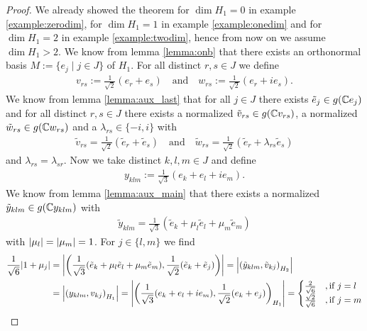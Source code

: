 \begin{proof}
	We already showed the theorem for $\dim H_1 = 0$ in example \ref{example:zerodim}, for $\dim H_1 = 1$ in example \ref{example:onedim} and for $\dim H_1 = 2$ in example \ref{example:twodim}, hence from now on we assume $\dim H_1 > 2$. We know from lemma \ref{lemma:onb} that there exists an orthonormal basis $M := \{e_j \mid j \in J\}$ of $H_1$. For all distinct $r,s \in J$ we define
	\begin{align*}
		v_{rs} := \frac{1}{\sqrt{2}}(e_r + e_s) \quad \text{and} \quad w_{rs} := \frac{1}{\sqrt{2}}(e_r + ie_s).
	\end{align*}
	 We know from lemma \ref{lemma:aux_last} that for all $j \in J$ there exists $\tilde{e}_j \in g(\mathbb{C} e_j)$ and for all distinct $r,s \in J$ there exists a normalized $\tilde{v}_{rs} \in g(\mathbb{C} v_{rs})$, a normalized $\tilde{w}_{rs} \in g(\mathbb{C} w_{rs})$ and a $\lambda_{rs} \in \{-i, i\}$ with 
	 \begin{align*}
	 \tilde{v}_{rs} = \frac{1}{\sqrt{2}}(\tilde{e}_r + \tilde{e}_s) \quad \text{and} \quad \tilde{w}_{rs} = \frac{1}{\sqrt{2}}(\tilde{e}_r + \lambda_{rs} \tilde{e}_s)
	 \end{align*}
	 and $\lambda_{rs} = \lambda_{sr}$. Now we take distinct $k,l,m \in J$ and define
	 \begin{align*}
	 	y_{klm} := \frac{1}{\sqrt{3}}(e_k + e_l + ie_m).
	 \end{align*}
	 We know from lemma \ref{lemma:aux_main} that there exists a normalized $\tilde{y}_{klm} \in g(\mathbb{C} y_{klm})$ with 
	 \begin{align*}
	 	\tilde{y}_{klm} = \frac{1}{\sqrt{3}}(\tilde{e}_k + \mu_l \tilde{e}_l + \mu_m \tilde{e}_m)
	 \end{align*}
	 with ${\left | \mu_l \right |} = {\left | \mu_m \right |} = 1$. For $j \in \{l,m\}$ we find
	 \begin{align*}
	 	\frac{1}{\sqrt{6}} \vbraces{1 + \mu_j} &= \vbraces{\pbraces{\frac{1}{\sqrt{3}}(\tilde{e}_k + \mu_l \tilde{e}_l + \mu_m \tilde{e}_m), \frac{1}{\sqrt{2}}(\tilde{e}_k + \tilde{e}_j)}} = \vbraces{\pbraces{\tilde{y}_{klm}, \tilde{v}_{kj}}_{H_2}} \\
	 	&= \vbraces{\pbraces{y_{klm}, v_{kj}}_{H_1}} = \vbraces{\pbraces{\frac{1}{\sqrt{3}}(e_k + e_l + ie_m), \frac{1}{\sqrt{2}}(e_k + e_j)}_{H_1}} = 
	 	\begin{cases}
	 		\frac{2}{\sqrt{6}} &, \text{if } j = l \\
	 		\frac{\sqrt{2}}{\sqrt{6}} &, \text{if } j = m
	 	\end{cases}

\end{align*}
\end{proof}
